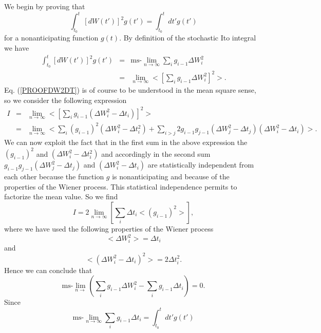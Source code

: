 We begin by proving that
\begin{equation}
\label{PROOFDW2DT}
\int_{t_0}^t \left[ dW(t') \right]^2 g(t') = \int_{t_0}^t dt' 
g(t')
\end{equation}
for a nonanticipating function $g(t)$. By definition of the 
stochastic Ito integral we have
\begin{eqnarray*}
\int_{t_0}^t \left[ dW(t') \right]^2 g(t') & = & 
\text{ms-}\lim_{n \rightarrow \infty} \sum_i g_{i-1} \Delta W_i^2 \\
   & = & \lim_{n \rightarrow \infty} 
    < \left[ \sum_i g_{i-1} \Delta W_i^2 \right]^2>.
\end{eqnarray*}
Eq. (\ref{PROOFDW2DT}) is of course to be understood in the mean
square sense, so we consider the following expression
\begin{eqnarray*}
I & = & \lim_{n \rightarrow \infty} 
< \left[ \sum_i g_{i-1} (\Delta W_i^2  -\Delta t_i)\right]^2   > 
\\
& = & \lim_{n \rightarrow \infty} 
<  \sum_i (g_{i-1})^2 (\Delta W_i^2  -\Delta t_i^2)
+\sum_{i>j} 2 g_{i-1}g_{j-1} (\Delta W_j^2  -\Delta t_j)
 (\Delta W_i^2  -\Delta t_i) >.
\end{eqnarray*}
We can now exploit the fact that in the first sum in the above expression
the $(g_{i-1})^2$ and $(\Delta W_i^2  -\Delta t_i^2)$ and accordingly in the 
second sum $g_{i-1}g_{j-1} (\Delta W_j^2  -\Delta t_j)$ and 
$(\Delta W_i^2  -\Delta t_i)$ are statistically independent from 
each other because the function $g$ is nonanticipating and because 
of the properties of the Wiener process. This statistical 
independence permits to factorize the mean value. So we find
\begin{equation*}
I = 2 \lim_{n \rightarrow \infty} 
\left[ \sum_i \Delta t_i <(g_{i-1})^2> \right],
\end{equation*}
where we have used the following properties of the Wiener process
\begin{equation*}
<\Delta W_i^2> = \Delta t_i
\end{equation*}
and
\begin{equation*}
<(\Delta W_i^2 - \Delta t_i)^2> = 2 \Delta t_i^2.
\end{equation*}
Hence we can conclude that
\begin{equation*}
\text{ms-}\lim_{n \rightarrow} 
\left( \sum_i g_{i-1} \Delta W_i^2 - \sum_i g_{i-1} \Delta t_i \right)
=0.
\end{equation*}
Since 
\begin{equation*}
\text{ms-}\lim_{n\rightarrow \infty} \sum_i g_{i-1} \Delta t_i =
\int_{t_0}^t dt' g(t')
\end{equation*}
